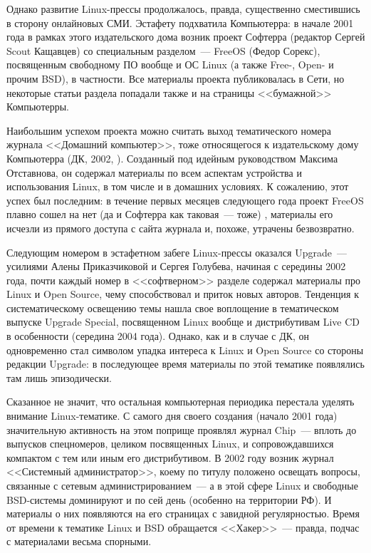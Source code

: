 Однако развитие Linux-прессы продолжалось, правда, существенно сместившись в сторону онлайновых СМИ. Эстафету подхватила Компьютерра: в начале 2001 года в рамках этого издательского дома возник проект Софтерра (редактор Сергей Scout Кащавцев) со специальным разделом~--- FreeOS (Федор Сорекс), посвященным свободному ПО вообще и ОС Linux (а также Free-, Open- и прочим BSD), в частности. Все материалы проекта публиковалась в Сети, но некоторые статьи раздела попадали также и на страницы <<бумажной>> Компьютерры.

Наибольшим успехом проекта можно считать выход тематического номера журнала <<Домашний компьютер>>, тоже относящегося к издательскому дому Компьютерра (ДК, 2002, ). Созданный под идейным руководством Максима Отставнова, он содержал материалы по всем аспектам устройства и использования Linux, в том числе и в домашних условиях. К сожалению, этот успех был последним: в течение первых месяцев следующего года проект FreeOS плавно сошел на нет (да и Софтерра как таковая~--- тоже) , материалы его исчезли из прямого доступа с сайта журнала и, похоже, утрачены безвозвратно.

Следующим номером в эстафетном забеге Linux-прессы оказался Upgrade~--- усилиями Алены Приказчиковой и Сергея Голубева, начиная с середины 2002 года, почти каждый номер в <<софтверном>> разделе содержал материалы про Linux и Open Source, чему способствовал и приток новых авторов. Тенденция к систематическому освещению темы нашла свое воплощение в тематическом выпуске Upgrade Special, посвященном Linux вообще и дистрибутивам Live CD в особенности (середина 2004 года). Однако, как и в случае с ДК, он одновременно стал символом упадка интереса к Linux и Open Source со стороны редакции Upgrade: в последующее время материалы по этой тематике появлялись там лишь эпизодически.

Сказанное не значит, что остальная компьютерная периодика перестала уделять внимание Linux-тематике. С самого дня своего создания (начало 2001 года) значительную активность на этом поприще проявлял журнал Chip~--- вплоть до выпусков спецномеров, целиком посвященных Linux, и сопровождавшихся компактом с тем или иным его дистрибутивом. В 2002 году возник журнал <<Системный администратор>>, коему по титулу положено освещать вопросы, связанные с сетевым администрированием~--- а в этой сфере Linux и свободные BSD-системы доминируют и по сей день (особенно на территории РФ). И материалы о них появляются на его страницах с завидной регулярностью. Время от времени к тематике Linux и BSD обращается <<Хакер>>~--- правда, подчас с материалами весьма спорными.

